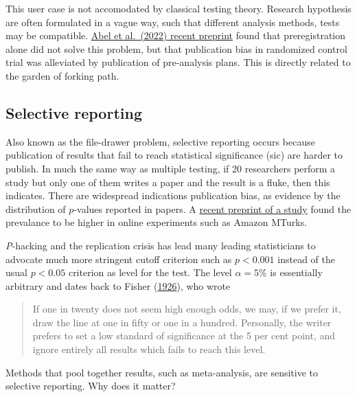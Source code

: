 \documentclass[
  11pt,
  letterpaper,
]{scrbook}
\theoremstyle{definition}
\theoremstyle{remark}
\begin{document}
This user case is not accomodated by classical testing theory. Research
hypothesis are often formulated in a vague way, such that different
analysis methods, tests may be compatible.
\href{https://docs.iza.org/dp15476.pdf}{Abel et al.~(2022) recent
preprint} found that preregistration alone did not solve this problem,
but that publication bias in randomized control trial was alleviated by
publication of pre-analysis plans. This is directly related to the
garden of forking path.

\hypertarget{selective-reporting}{%
\subsection{Selective reporting}\label{selective-reporting}}

Also known as the file-drawer problem, selective reporting occurs
because publication of results that fail to reach statistical
significance (sic) are harder to publish. In much the same way as
multiple testing, if 20 researchers perform a study but only one of them
writes a paper and the result is a fluke, then this indicates. There are
widespread indications publication bias, as evidence by the distribution
of \(p\)-values reported in papers. A
\href{https://docs.iza.org/dp15478.pdf}{recent preprint of a study}
found the prevalance to be higher in online experiments such as Amazon
MTurks.

\emph{P}-hacking and the replication crisis has lead many leading
statisticians to advocate much more stringent cutoff criterion such as
\(p < 0.001\) instead of the usual \(p<0.05\) criterion as level for the
test. The level \(\alpha=5\)\% is essentially arbitrary and dates back
to Fisher (\protect\hyperlink{ref-Fisher:1926}{1926}), who wrote

\begin{quote}
If one in twenty does not seem high enough odds, we may, if we prefer
it, draw the line at one in fifty or one in a hundred. Personally, the
writer prefers to set a low standard of significance at the 5 per cent
point, and ignore entirely all results which fails to reach this level.
\end{quote}

\begin{tcolorbox}[enhanced jigsaw, breakable, toptitle=1mm, left=2mm, bottomrule=.15mm, colframe=quarto-callout-note-color-frame, colback=white, rightrule=.15mm, title=\textcolor{quarto-callout-note-color}{\faInfo}\hspace{0.5em}{Thinking outside the box}, opacityback=0, toprule=.15mm, titlerule=0mm, colbacktitle=quarto-callout-note-color!10!white, bottomtitle=1mm, arc=.35mm, coltitle=black, opacitybacktitle=0.6, leftrule=.75mm]

Methods that pool together results, such as meta-analysis, are sensitive
to selective reporting. Why does it matter?

\end{tcolorbox}
\end{document}

